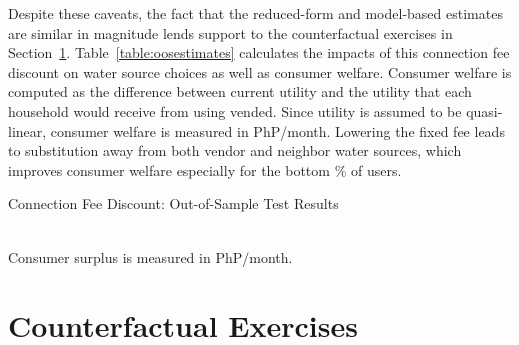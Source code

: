 \documentclass[12pt]{article}
\begin{document}
Despite these caveats, the fact that the reduced-form and model-based estimates are similar in magnitude lends support to the counterfactual exercises in Section~\ref{section:counterfactualexercises}.  Table~\ref{table:oosestimates} calculates the impacts of this connection fee discount on water source choices as well as consumer welfare.  Consumer welfare is computed as the difference between current utility and the utility that each household would receive from using vended.  Since utility is assumed to be quasi-linear, consumer welfare is measured in PhP/month.  Lowering the fixed fee leads to substitution away from both vendor and neighbor water sources, which improves consumer welfare especially for the bottom \unskip\% of users.

\begin{table}
\centering
\caption{Connection Fee Discount: Out-of-Sample Test Results}\label{table:oosestimates}
 \\ 
\footnotesize{Consumer surplus is measured in PhP/month.}
\end{table}


\section{Counterfactual Exercises}\label{section:counterfactualexercises}
\end{document}
